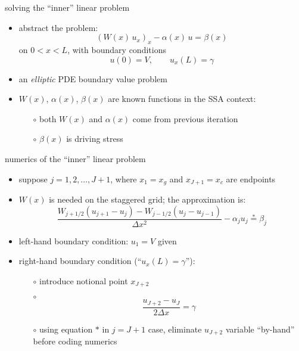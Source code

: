 \begin{frame}{solving the ``inner'' linear problem}
\begin{itemize}
\item abstract the problem:
   $$\left(W(x)\, u_x\right)_x - \alpha(x)\, u = \beta(x)$$
on $0 < x < L$, with boundary conditions
   $$u(0) = V, \qquad  u_x(L) = \gamma$$
\item an \emph{elliptic} PDE boundary value problem
\item $W(x)$, $\alpha(x)$, $\beta(x)$ are known functions in the SSA context:
  \begin{itemize}
  \item[$\circ$] both $W(x)$ and $\alpha(x)$ come from previous iteration
  \item[$\circ$] $\beta(x)$ is driving stress
  \end{itemize}
\end{itemize}
\end{frame}


\begin{frame}{numerics of the ``inner'' linear problem}

\begin{itemize}
\item suppose $j=1,2,\dots,J+1$, where $x_1 = x_g$ and $x_{J+1} = x_c$ are endpoints
\item $W(x)$ is needed on the staggered grid; the approximation is:
$$\frac{W_{j+1/2} (u_{j+1} - u_j) - W_{j-1/2} (u_{j} - u_{j-1})}{\Delta x^2} - \alpha_j u_j \stackrel{\ast}{=} \beta_j$$
\item left-hand boundary condition: $u_1 = V$ given
\item right-hand boundary condition (``$u_x(L)=\gamma$''):
  \begin{itemize}
  \item[$\circ$] introduce notional point $x_{J+2}$
  \item[$\circ$]
    $$\frac{u_{J+2} - u_J}{2 \Delta x} = \gamma$$
  \item[$\circ$] using equation $\ast$ in $j=J+1$ case, eliminate $u_{J+2}$ variable ``by-hand'' before coding numerics
  \end{itemize}
\end{itemize}
\end{frame}


